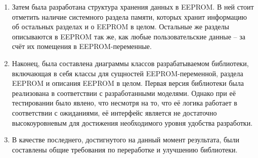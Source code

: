 \documentclass[14pt]{extarticle}
\begin{document}
\begin{enumerate}
	\item Затем была разработана структура хранения данных в EEPROM.
	В ней стоит отметить наличие системного раздела памяти, которых хранит информацию об остальных разделах и о EEPROM в целом.
	Остальные же разделы описываются в EEPROM так же, как любые пользовательские данные -- за счёт их помещения в EEPROM-переменные.
	\item Наконец, была составлена диаграммы классов разрабатываемом библиотеки, включающая в себя классы для сущностей EEPROM-переменной, раздела EEPROM и описания EEPROM в целом.
	Первая версия библиотеки была реализована в соответствии с разработанными моделями.
	Однако при её тестировании было явлено, что несмотря на то, что её логика работает в соответствии с ожиданиями, её интерфейс является не достаточно высокоуровневым для достижения необходимого уровня удобства разработки.
	\item В качестве последнего, достигнутого на данный момент результата, были составлены общие требования по переработке и улучшению библиотеки.

	
\end{enumerate}
\end{document}
